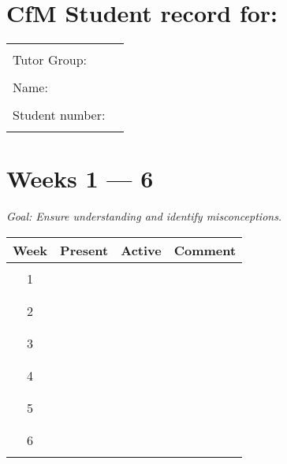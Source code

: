 \documentclass[12pt]{article}
\begin{document}
\section*{CfM Student record for:}

\begin{center}
	\begin{tabular}{lp{}}
		                & \\
		Tutor Group:    & \\
		                & \\
		Name:           & \\
		                & \\
		Student number: & \\
		                & \\
	\end{tabular}
\end{center}

\section*{Weeks 1 --- 6}
\centering\small{\textit{Goal: Ensure understanding and identify misconceptions.}}

\begin{center}
	\begin{tabular}{c|l|l|p{}}
		\toprule
		Week        & Present & Active & Comment\\
		\midrule
		            &         &        & \\
		1           &         &        & \\
		            &         &        & \\
		\midrule
		            &         &        & \\
		2           &         &        & \\
		            &         &        & \\
		\midrule
		            &         &        & \\
		3           &         &        & \\
		            &         &        & \\
		\midrule
		            &         &        & \\
		4           &         &        & \\
		            &         &        & \\
		\midrule
		            &         &        & \\
		5           &         &        & \\
		            &         &        & \\
		\midrule
		            &         &        & \\
		6           &         &        & \\
		            &         &        & \\
		\bottomrule
	\end{tabular}
\end{center}
\end{document}

